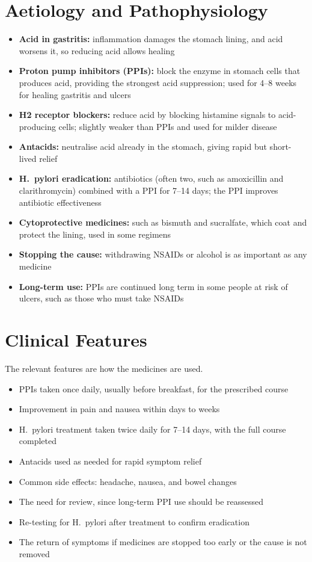\section*{Aetiology and Pathophysiology}
\begin{itemize}
    \item \textbf{Acid in gastritis:} inflammation damages the stomach lining, and acid worsens it, so reducing acid allows healing
    \item \textbf{Proton pump inhibitors (PPIs):} block the enzyme in stomach cells that produces acid, providing the strongest acid suppression; used for 4--8 weeks for healing gastritis and ulcers
    \item \textbf{H2 receptor blockers:} reduce acid by blocking histamine signals to acid-producing cells; slightly weaker than PPIs and used for milder disease
    \item \textbf{Antacids:} neutralise acid already in the stomach, giving rapid but short-lived relief
    \item \textbf{H.\ pylori eradication:} antibiotics (often two, such as amoxicillin and clarithromycin) combined with a PPI for 7--14 days; the PPI improves antibiotic effectiveness
    \item \textbf{Cytoprotective medicines:} such as bismuth and sucralfate, which coat and protect the lining, used in some regimens
    \item \textbf{Stopping the cause:} withdrawing NSAIDs or alcohol is as important as any medicine
    \item \textbf{Long-term use:} PPIs are continued long term in some people at risk of ulcers, such as those who must take NSAIDs
\end{itemize}

\section*{Clinical Features}
The relevant features are how the medicines are used.
\begin{itemize}
    \item PPIs taken once daily, usually before breakfast, for the prescribed course
    \item Improvement in pain and nausea within days to weeks
    \item H.\ pylori treatment taken twice daily for 7--14 days, with the full course completed
    \item Antacids used as needed for rapid symptom relief
    \item Common side effects: headache, nausea, and bowel changes
    \item The need for review, since long-term PPI use should be reassessed
    \item Re-testing for H.\ pylori after treatment to confirm eradication
    \item The return of symptoms if medicines are stopped too early or the cause is not removed
\end{itemize}

